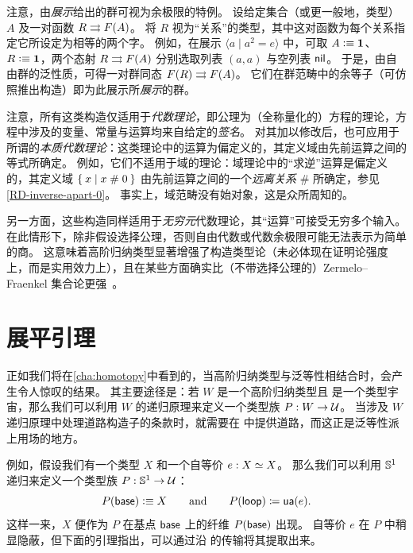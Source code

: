 %
注意，由\emph{展示}给出的群可视为余极限的特例。
设给定集合（或更一般地，类型）$A$ 及一对函数 $R\rightrightarrows F(A)$。
将 $R$ 视为``关系''的类型，其中这对函数为每个关系指定它所设定为相等的两个字。
例如，在展示 $\langle a \mid a^2 = e \rangle$ 中，可取 $A\vcentcolon\equiv \mathbf{1}$、$R\vcentcolon\equiv \mathbf{1}$，两个态射 $R\rightrightarrows F(A)$ 分别选取列表 $(a,a)$ 与空列表 $\mathsf{nil}$。
于是，由自由群的泛性质，可得一对群同态 $F(R) \rightrightarrows F(A)$。
它们在群范畴中的余等子（可仿照推出构造）即为此展示所\emph{展示}的群。

\mentalpause

注意，所有这类构造仅适用于\emph{代数理论}，即公理为（全称量化的）方程的理论，方程中涉及的变量、常量与运算均来自给定的\emph{签名}。
对其加以修改后，也可应用于所谓的\emph{本质代数理论}：这类理论中的运算为偏定义的，其定义域由先前运算之间的等式所确定。
例如，它们不适用于域的理论：域理论中的``求逆''运算是偏定义的，其定义域 $\Set{x | x \mathrel{\#} 0}$ 由先前运算之间的一个\emph{远离关系} $\#$ 所确定，参见 \cref{RD-inverse-apart-0}。
事实上，域范畴没有始对象，这是众所周知的。
%

另一方面，这些构造同样适用于\emph{无穷元}代数理论，其``运算''可接受无穷多个输入。
在此情形下，除非假设选择公理，否则自由代数或代数余极限可能无法表示为简单的商。
这意味着高阶归纳类型显著增强了构造类型论（未必体现在证明论强度上，而是实用效力上），且在某些方面确实比（不带选择公理的）Zermelo--Fraenkel 集合论更强~\cite{blass:freealg}。

\section{展平引理}
\label{sec:flattening}

正如我们将在\cref{cha:homotopy}中看到的，当高阶归纳类型与泛等性相结合时，会产生令人惊叹的结果。
其主要途径是：若 $W$ 是一个高阶归纳类型且 \UU 是一个类型宇宙，那么我们可以利用 $W$ 的递归原理来定义一个类型族 $P:W\to \mathcal{U}$。
当涉及 $W$ 递归原理中处理道路构造子的条款时，就需要在 \UU 中提供道路，而这正是泛等性派上用场的地方。

例如，假设我们有一个类型 $X$ 和一个自等价 $e:X \simeq X$。
那么我们可以利用 $\mathbb{S}^1$ 递归来定义一个类型族 $P:\mathbb{S}^1 \to \mathcal{U}$：
\begin{equation*}
  P(\mathsf{base}) \vcentcolon\equiv X
  \qquad\text{and}\qquad
  {P}\mathopen{}\left({\mathsf{loop}}\right)\mathclose{} \coloneqq \mathsf{ua}(e).
\end{equation*}
这样一来，$X$ 便作为 $P$ 在基点 $\mathsf{base}$ 上的纤维 $P(\mathsf{base})$ 出现。
自等价 $e$ 在 $P$ 中稍显隐蔽，但下面的引理指出，可以通过沿 \lloop 的传输将其提取出来。

